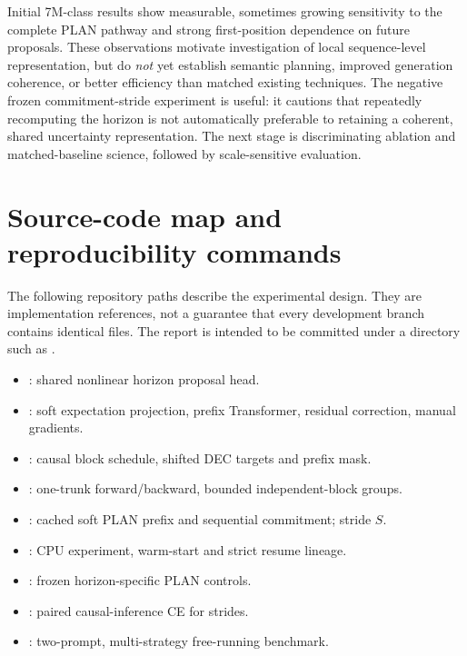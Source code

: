 \documentclass[11pt,letterpaper]{article}
\begin{document}
Initial 7M-class results show measurable, sometimes growing sensitivity to the complete PLAN pathway and strong first-position dependence on future proposals. These observations motivate investigation of local sequence-level representation, but do \emph{not} yet establish semantic planning, improved generation coherence, or better efficiency than matched existing techniques. The negative frozen commitment-stride experiment is useful: it cautions that repeatedly recomputing the horizon is not automatically preferable to retaining a coherent, shared uncertainty representation. The next stage is discriminating ablation and matched-baseline science, followed by scale-sensitive evaluation.

\appendix
\section{Source-code map and reproducibility commands}
The following repository paths describe the experimental design. They are implementation references, not a guarantee that every development branch contains identical files. The report is intended to be committed under a directory such as .
\begin{itemize}
\item {}: shared nonlinear horizon proposal head.
\item {}: soft expectation projection, prefix Transformer, residual correction, manual gradients.
\item {}: causal block schedule, shifted DEC targets and prefix mask.
\item {}: one-trunk forward/backward, bounded independent-block groups.
\item {}: cached soft PLAN prefix and sequential commitment; stride $S$.
\item {}: CPU experiment, warm-start and strict resume lineage.
\item {}: frozen horizon-specific PLAN controls.
\item {}: paired causal-inference CE for strides.
\item {}: two-prompt, multi-strategy free-running benchmark.
\end{itemize}
\end{document}
